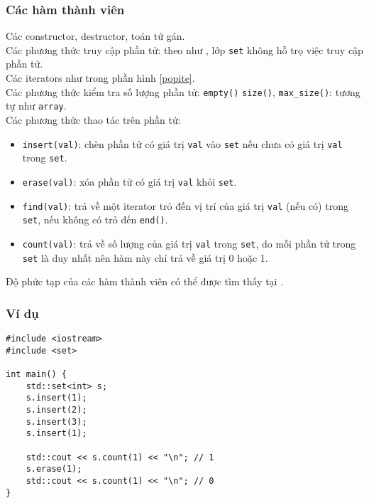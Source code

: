 \subsubsection{Các hàm thành viên}
Các constructor, destructor, toán tử gán.\\
Các phương thức truy cập phần tử: theo như \cite{set}, lớp \lstinline{set} không hỗ trọ việc truy cập phần tử.\\
Các iterators như trong phần hình \ref{popite}.\\
Các phương thức kiểm tra số lượng phần tử: \lstinline{empty()} \lstinline{size()}, \lstinline{max_size()}: tương tự như \lstinline{array}.\\
Các phương thức thao tác trên phần tử:
\begin{itemize} 
    \item \lstinline{insert(val)}: chèn phần tử có giá trị \lstinline{val} vào \lstinline{set} nếu chưa có giá trị \lstinline{val} trong \lstinline{set}.
    \item \lstinline{erase(val)}: xóa phần tử có giá trị \lstinline{val} khỏi \lstinline{set}.
    \item \lstinline{find(val)}: trả về một iterator trỏ đến vị trí của giá trị \lstinline{val} (nếu có) trong \lstinline{set}, nếu không có trỏ đến \lstinline{end()}.
    \item \lstinline{count(val)}: trả về số lượng của giá trị \lstinline{val}  trong \lstinline{set}, do mỗi phần tử trong \lstinline{set} là duy nhất nên hàm này chỉ trả về giá trị 0 hoặc 1.
\end{itemize}
Độ phức tạp của các hàm thành viên có thể được tìm thấy tại \cite{set}.
\subsubsection{Ví dụ}
\begin{lstlisting}
#include <iostream>
#include <set>
 
int main() {
    std::set<int> s;
    s.insert(1);
    s.insert(2);
    s.insert(3);
    s.insert(1);
 
    std::cout << s.count(1) << "\n"; // 1
    s.erase(1);
    std::cout << s.count(1) << "\n"; // 0
}
\end{lstlisting}

